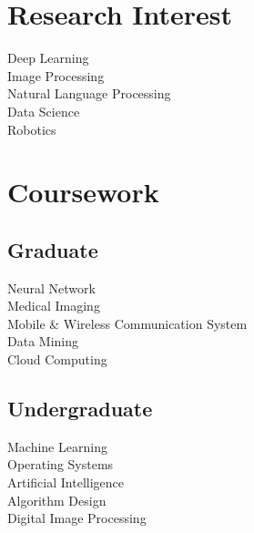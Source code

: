 \documentclass[]{deedy-resume-openfont}
\begin{document}
\begin{minipage}[t]{0.33\textwidth}
\section{Research Interest}
Deep Learning \\
Image Processing \\
Natural Language Processing \\
Data Science \\
Robotics
\sectionsep


\section{Coursework}
\subsection{Graduate}
Neural Network \\
Medical Imaging \\
Mobile \& Wireless Communication System \\
Data Mining \\
Cloud Computing \\
\sectionsep

\subsection{Undergraduate}
Machine Learning \\
Operating Systems \\
Artificial Intelligence \\
Algorithm Design \\
Digital Image Processing \\
\sectionsep



\end{minipage}
\end{document}
